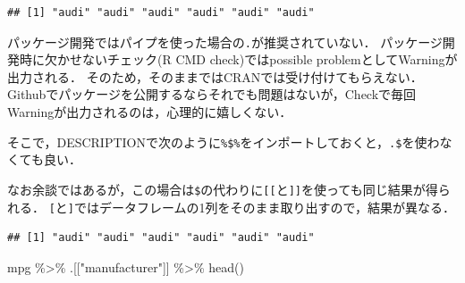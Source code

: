 \documentclass[
]{article}
\newenvironment{Shaded}{\begin{snugshade}}{\end{snugshade}}
\newcommand{\FunctionTok}[1]{\textcolor[rgb]{0.00,0.00,0.00}{#1}}
\newcommand{\NormalTok}[1]{#1}
\newcommand{\SpecialCharTok}[1]{\textcolor[rgb]{0.00,0.00,0.00}{#1}}
\newcommand{\StringTok}[1]{\textcolor[rgb]{0.31,0.60,0.02}{#1}}
\begin{document}
\begin{Shaded}
\end{Shaded}

\begin{verbatim}
## [1] "audi" "audi" "audi" "audi" "audi" "audi"
\end{verbatim}

パッケージ開発ではパイプを使った場合の\texttt{.}が推奨されていない．
パッケージ開発時に欠かせないチェック(R CMD check)ではpossible problemとしてWarningが出力される．
そのため，そのままではCRANでは受け付けてもらえない．
Githubでパッケージを公開するならそれでも問題はないが，Checkで毎回Warningが出力されるのは，心理的に嬉しくない．

そこで，DESCRIPTIONで次のように\texttt{\%\$\%}をインポートしておくと，\texttt{.\$}を使わなくても良い．

\begin{Shaded}
\end{Shaded}

なお余談ではあるが，この場合は\texttt{\$}の代わりに\texttt{{[}{[}}と\texttt{{]}{]}}を使っても同じ結果が得られる．
\texttt{{[}}と\texttt{{]}}ではデータフレームの1列をそのまま取り出すので，結果が異なる．

\begin{Shaded}
\end{Shaded}

\begin{verbatim}
## [1] "audi" "audi" "audi" "audi" "audi" "audi"
\end{verbatim}

\begin{Shaded}
\begin{Highlighting}[]
\NormalTok{mpg }\SpecialCharTok{\%\textgreater{}\%}\NormalTok{ .[[}\StringTok{"manufacturer"}\NormalTok{]] }\SpecialCharTok{\%\textgreater{}\%} \FunctionTok{head}\NormalTok{()}
\end{Highlighting}
\end{Shaded}
\end{document}
